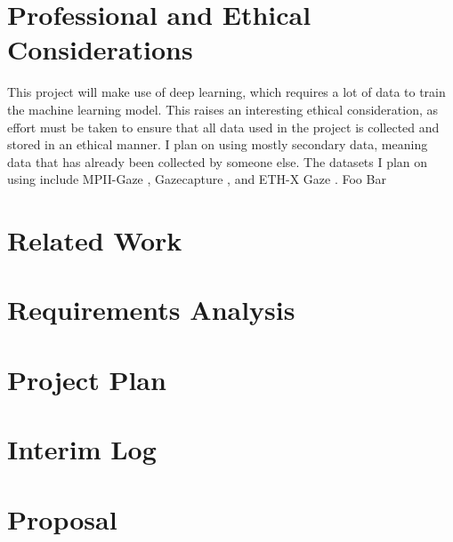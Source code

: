 \documentclass[twocolumn]{report}
\begin{document}
    

    




\chapter{Professional and Ethical Considerations}

This project will make use of deep learning, which requires a lot of data to train the machine learning model. This raises an interesting ethical consideration, as effort must be taken to ensure that all data used in the project is collected and stored in an ethical manner. I plan on using mostly secondary data, meaning data that has already been collected by someone else. The datasets I plan on using include MPII-Gaze \cite{cheng2021survey}, Gazecapture \cite{krafka2016eye}, and ETH-X Gaze \cite{zhang2020ethxgaze}. Foo Bar 

\chapter{Related Work}

\chapter{Requirements Analysis}
\chapter{Project Plan}
\chapter{Interim Log}
\chapter{Proposal}

\printbibliography
\end{document}

